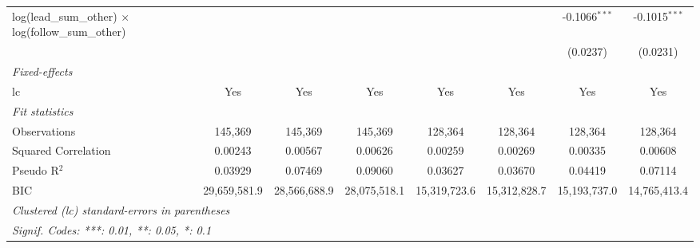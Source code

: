 \begin{tabular}{lccccccc}
   log(lead\_sum\_other) $\times$ log(follow\_sum\_other)      &               &                &                 &                &                & -0.1066$^{***}$ & -0.1015$^{***}$\\   
                                                               &               &                &                 &                &                & (0.0237)        & (0.0231)\\   
   \midrule
   \emph{Fixed-effects}\\
   lc                                                          & Yes           & Yes            & Yes             & Yes            & Yes            & Yes             & Yes\\  
   \midrule
   \emph{Fit statistics}\\
   Observations                                                & 145,369       & 145,369        & 145,369         & 128,364        & 128,364        & 128,364         & 128,364\\  
   Squared Correlation                                         & 0.00243       & 0.00567        & 0.00626         & 0.00259        & 0.00269        & 0.00335         & 0.00608\\  
   Pseudo R$^2$                                                & 0.03929       & 0.07469        & 0.09060         & 0.03627        & 0.03670        & 0.04419         & 0.07114\\  
   BIC                                                         & 29,659,581.9  & 28,566,688.9   & 28,075,518.1    & 15,319,723.6   & 15,312,828.7   & 15,193,737.0    & 14,765,413.4\\  
   \midrule \midrule
   \multicolumn{8}{l}{\emph{Clustered (lc) standard-errors in parentheses}}\\
   \multicolumn{8}{l}{\emph{Signif. Codes: ***: 0.01, **: 0.05, *: 0.1}}\\
\end{tabular}
\par\endgroup


